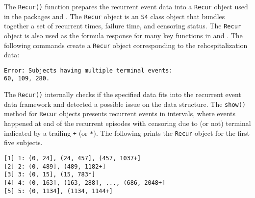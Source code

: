 The \texttt{Recur()} function prepares the recurrent event data into a
\texttt{Recur} object used in the packages  and .
The \texttt{Recur} object is an \texttt{S4} class object that bundles
together a set of recurrent times, failure time, and censoring status.
The \texttt{Recur} object is also used as the formula response for many
key functions in  and . The following commands
create a \texttt{Recur} object corresponding to the rehospitalization
data:

\begin{Shaded}
\begin{Highlighting}[]
 \NormalTok{)}
\end{Highlighting}
\end{Shaded}

\begin{verbatim}
Error: Subjects having multiple terminal events:
60, 109, 280.
\end{verbatim}

The \texttt{Recur()} internally checks if the specified data fits into
the recurrent event data framework and detected a possible issue on the
data structure. The \texttt{show()} method for \texttt{Recur} objects
presents recurrent events in intervals, where events happened at end of
the recurrent episodes with censoring due to (or not) terminal indicated
by a trailing \texttt{+} (or \texttt{*}). The following prints the
\texttt{Recur} object for the first five subjects.

\begin{Shaded}
\begin{Highlighting}[]
\NormalTok{(readmission[}\OperatorTok{:}\NormalTok{,], }
\end{Highlighting}
\end{Shaded}

\begin{verbatim}
[1] 1: (0, 24], (24, 457], (457, 1037+]       
[2] 2: (0, 489], (489, 1182+]                 
[3] 3: (0, 15], (15, 783*]                    
[4] 4: (0, 163], (163, 288], ..., (686, 2048+]
[5] 5: (0, 1134], (1134, 1144+]               
\end{verbatim}
